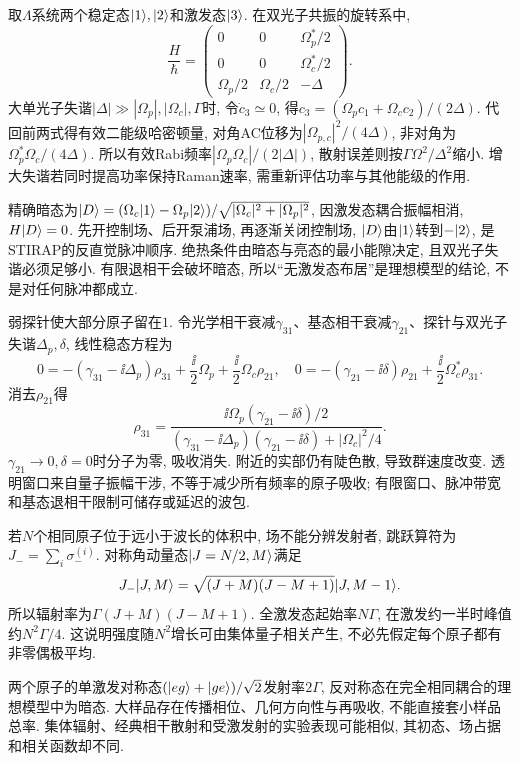 取$\Lambda$系统两个稳定态$\lvert 1\rangle,\lvert 2\rangle$和激发态$\lvert 3\rangle$. 在双光子共振的旋转系中,
\[\frac H\hbar=\begin{pmatrix}0&0&\Omega_p^*/2\\0&0&\Omega_c^*/2\\\Omega_p/2&\Omega_c/2&-\Delta\end{pmatrix}.\]
大单光子失谐$|\Delta|\gg|\Omega_p|,|\Omega_c|,\Gamma$时, 令$\dot c_3\simeq0$, 得$c_3=(\Omega_pc_1+\Omega_cc_2)/(2\Delta)$. 代回前两式得有效二能级哈密顿量, 对角AC位移为$|\Omega_{p,c}|^2/(4\Delta)$, 非对角为$\Omega_p^*\Omega_c/(4\Delta)$. 所以有效Rabi频率$|\Omega_p\Omega_c|/(2|\Delta|)$, 散射误差则按$\Gamma\Omega^2/\Delta^2$缩小. 增大失谐若同时提高功率保持Raman速率, 需重新评估功率与其他能级的作用.

精确暗态为$\lvert D\rangle=(\Omega_c\lvert 1\rangle-\Omega_p\lvert 2\rangle)/\sqrt{|\Omega_c|^2+|\Omega_p|^2}$, 因激发态耦合振幅相消, $H\lvert D\rangle=0$. 先开控制场、后开泵浦场, 再逐渐关闭控制场, $\lvert D\rangle$由$\lvert 1\rangle$转到$-\lvert 2\rangle$, 是STIRAP的反直觉脉冲顺序. 绝热条件由暗态与亮态的最小能隙决定, 且双光子失谐必须足够小. 有限退相干会破坏暗态, 所以“无激发态布居”是理想模型的结论, 不是对任何脉冲都成立.

弱探针使大部分原子留在$1$. 令光学相干衰减$\gamma_{31}$、基态相干衰减$\gamma_{21}$、探针与双光子失谐$\Delta_p,\delta$, 线性稳态方程为
\[0=-(\gamma_{31}-\ii\Delta_p)\rho_{31}+\frac\ii2\Omega_p+\frac\ii2\Omega_c\rho_{21},\quad0=-(\gamma_{21}-\ii\delta)\rho_{21}+\frac\ii2\Omega_c^*\rho_{31}.\]
消去$\rho_{21}$得
\[\rho_{31}=\frac{\ii\Omega_p(\gamma_{21}-\ii\delta)/2}{(\gamma_{31}-\ii\Delta_p)(\gamma_{21}-\ii\delta)+|\Omega_c|^2/4}.\]
$\gamma_{21}\to0,\delta=0$时分子为零, 吸收消失. 附近的实部仍有陡色散, 导致群速度改变. 透明窗口来自量子振幅干涉, 不等于减少所有频率的原子吸收; 有限窗口、脉冲带宽和基态退相干限制可储存或延迟的波包.

若$N$个相同原子位于远小于波长的体积中, 场不能分辨发射者, 跳跃算符为$J_- =\sum_i\sigma_-^{(i)}$. 对称角动量态$\lvert J=N/2,M\rangle$满足
\[J_-\lvert J,M\rangle=\sqrt{(J+M)(J-M+1)}\lvert J,M-1\rangle.\]
所以辐射率为$\Gamma(J+M)(J-M+1)$. 全激发态起始率$N\Gamma$, 在激发约一半时峰值约$N^2\Gamma/4$. 这说明强度随$N^2$增长可由集体量子相关产生, 不必先假定每个原子都有非零偶极平均.

两个原子的单激发对称态$(\lvert eg\rangle+\lvert ge\rangle)/\sqrt2$发射率$2\Gamma$, 反对称态在完全相同耦合的理想模型中为暗态. 大样品存在传播相位、几何方向性与再吸收, 不能直接套小样品总率. 集体辐射、经典相干散射和受激发射的实验表现可能相似, 其初态、场占据和相关函数却不同.

